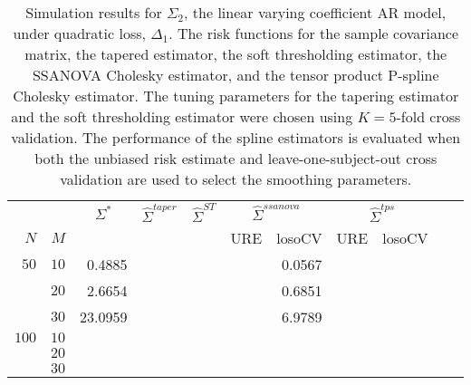 \documentclass[12pt]{article}
\newcommand{\ra}[1]{\renewcommand{\arraystretch}{#1}}
\theoremstyle{definition}
\begin{document}
\begin{table}\centering
\ra{1.3}
\caption{Simulation results for $\Sigma_2$, the linear varying coefficient AR model, under quadratic loss, $\Delta_1$. The risk functions for the sample covariance matrix, the tapered estimator, the soft thresholding estimator, the SSANOVA Cholesky estimator, and the tensor product P-spline Cholesky estimator. The tuning parameters for the tapering estimator and the soft thresholding estimator were chosen using $K = 5$-fold cross validation. The performance of the spline estimators is evaluated when both the unbiased risk estimate and leave-one-subject-out cross validation are used to select the smoothing parameters.}
\begin{tabular}{@{}rrrcrcrrcrr@{}}\toprule
   &            & \multicolumn{1}{c}{$\Sigma^*$}  & \multicolumn{1}{c}{$\hat{\Sigma}^{taper}$} &\multicolumn{1}{c}{$\hat{\Sigma}^{ST}$} &\multicolumn{2}{c}{ $\hat{\Sigma}^{ssanova}$} &  \multicolumn{2}{c}{ $\hat{\Sigma}^{tps}$}\\
$N$ & $M$ 	&	  &	& & \multicolumn{1}{c}{\mbox{URE}} & \multicolumn{1}{c}{\mbox{losoCV}} &\multicolumn{1}{c}{\mbox{URE}} & \multicolumn{1}{c}{\mbox{losoCV}}\\ \midrule
$50$ & $10$ &	0.4885	&&&&  0.0567	&&\\
  & $20$  &    2.6654	&&&&   0.6851	&&\\
  & $30$   &  23.0959   &&&&  6.9789    &&\\ \midrule
$100$ & $10$ &&&&&&&\\
& $20$  &&&&&&& \\
& $30$  &&&&&	&& \\
\bottomrule
\end{tabular}
\end{table}
\end{document}
